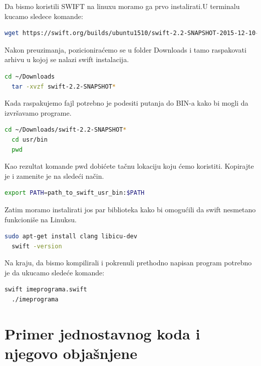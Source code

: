 \documentclass[a4paper]{article}
\begin{document}
Da bismo koristili SWIFT na linuxu moramo ga prvo instalirati.U terminalu kucamo sledece komande:

\begin{lstlisting}[language=bash]
	wget https://swift.org/builds/ubuntu1510/swift-2.2-SNAPSHOT-2015-12-10-a/swift-2.2-SNAPSHOT-2015-12-10-a-ubuntu15.10.tar.gz

\end{lstlisting}
Nakon preuzimanja, pozicioniraćemo se u folder Downloads i tamo raspakovati arhivu u kojoj se nalazi swift instalacija.

\begin{lstlisting}[language=bash]
  cd ~/Downloads
  tar -xvzf swift-2.2-SNAPSHOT*
\end{lstlisting}

Kada raspakujemo fajl potrebno je podesiti putanja do BIN-a kako bi mogli da izvršavamo programe.

\begin{lstlisting}[language=bash]
  cd ~/Downloads/swift-2.2-SNAPSHOT*
  cd usr/bin
  pwd
\end{lstlisting}

Kao rezultat komande pwd dobićete tačnu lokaciju koju ćemo koristiti. Kopirajte je i zamenite je na sledeći način.
\begin{lstlisting}[language=bash]
  export PATH=path_to_swift_usr_bin:$PATH

\end{lstlisting}

Zatim moramo instalirati jos par biblioteka kako bi omogućili da swift nesmetano funkcioniše na Linuksu.

\begin{lstlisting}[language=bash]
  sudo apt-get install clang libicu-dev
  swift -version
\end{lstlisting}

Na kraju, da bismo kompilirali i pokrenuli prethodno napisan program potrebno je da ukucamo sledeće komande:

\begin{lstlisting}[language=bash]
  swift imeprograma.swift
  ./imeprograma
\end{lstlisting}



\section{Primer jednostavnog koda i njegovo objašnjene}	
\label{sec:sestiDeo}
\end{document}
